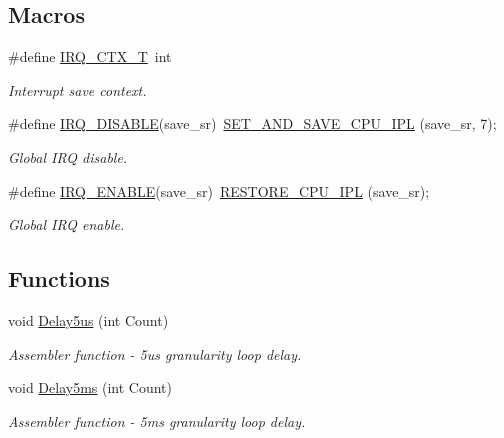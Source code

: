 \subsection*{Macros}
\begin{DoxyCompactItemize}
\item 
\#define \hyperlink{a00033_a6d4f0a7397640f5b011ca9c39d47dc72}{I\+R\+Q\+\_\+\+C\+T\+X\+\_\+\+T}~int
\begin{DoxyCompactList}\small\item\em Interrupt save context. \end{DoxyCompactList}\item 
\#define \hyperlink{a00033_a357168bbe78739811cdb7b5576714ca6}{I\+R\+Q\+\_\+\+D\+I\+S\+A\+B\+L\+E}(save\+\_\+sr)~\hyperlink{a00014_a6e65280d03605e855814536f977b6e8f}{S\+E\+T\+\_\+\+A\+N\+D\+\_\+\+S\+A\+V\+E\+\_\+\+C\+P\+U\+\_\+\+I\+P\+L} (save\+\_\+sr, 7);
\begin{DoxyCompactList}\small\item\em Global I\+R\+Q disable. \end{DoxyCompactList}\item 
\#define \hyperlink{a00033_abc8e0f43382f8b0fdf60d35a93c20c57}{I\+R\+Q\+\_\+\+E\+N\+A\+B\+L\+E}(save\+\_\+sr)~\hyperlink{a00014_ae3ee8b9afce2d4e5ed1a3a725afbba04}{R\+E\+S\+T\+O\+R\+E\+\_\+\+C\+P\+U\+\_\+\+I\+P\+L} (save\+\_\+sr);
\begin{DoxyCompactList}\small\item\em Global I\+R\+Q enable. \end{DoxyCompactList}\end{DoxyCompactItemize}
\subsection*{Functions}
\begin{DoxyCompactItemize}
\item 
void \hyperlink{a00033_a3b0017f6ec0e04a6435bba00fe325294}{Delay5us} (int Count)
\begin{DoxyCompactList}\small\item\em Assembler function -\/ 5us granularity loop delay. \end{DoxyCompactList}\item 
void \hyperlink{a00033_ac529343dfb6363f115d0f9213fbe4317}{Delay5ms} (int Count)
\begin{DoxyCompactList}\small\item\em Assembler function -\/ 5ms granularity loop delay. \end{DoxyCompactList}\end{DoxyCompactItemize}
